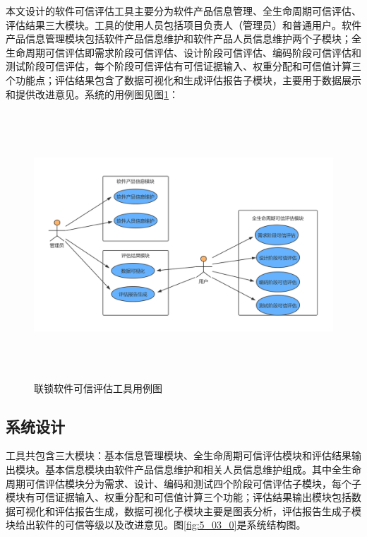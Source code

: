 本文设计的软件可信评估工具主要分为软件产品信息管理、全生命周期可信评估、评估结果三大模块。工具的使用人员包括项目负责人（管理员）和普通用户。软件产品信息管理模块包括软件产品信息维护和软件产品人员信息维护两个子模块；全生命周期可信评估即需求阶段可信评估、设计阶段可信评估、编码阶段可信评估和测试阶段可信评估，每个阶段可信评估有可信证据输入、权重分配和可信值计算三个功能点；评估结果包含了数据可视化和生成评估报告子模块，主要用于数据展示和提供改进意见。系统的用例图见图\ref{fig:5_01}：
\begin{figure}[H]
	\centering
	\includegraphics[width=15cm,height=10cm]{fig/5_01.png}
	\caption{联锁软件可信评估工具用例图}
	\label{fig:5_01}
\end{figure}



\subsection{系统设计}
工具共包含三大模块：基本信息管理模块、全生命周期可信评估模块和评估结果输出模块。基本信息模块由软件产品信息维护和相关人员信息维护组成。其中全生命周期可信评估模块分为需求、设计、编码和测试四个阶段可信评估子模块，每个子模块有可信证据输入、权重分配和可信值计算三个功能；评估结果输出模块包括数据可视化和评估报告生成，数据可视化子模块主要是图表分析，评估报告生成子模块给出软件的可信等级以及改进意见。图\ref{fig:5_03_0}是系统结构图。

